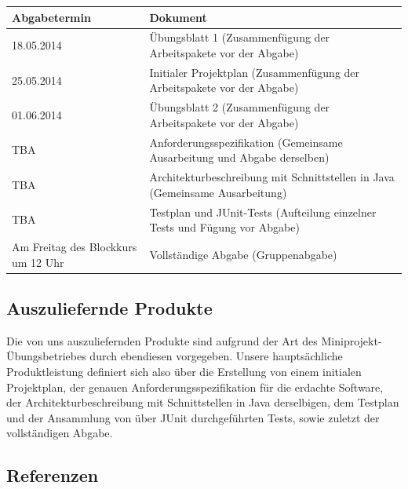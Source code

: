 \documentclass[fontsize=12pt,paper=a4,twoside]{scrartcl}
\begin{document}
\begin{tabular}{|p{7.5cm}|p{7.5cm}|}\hline
   \textbf{Abgabetermin} & \textbf{Dokument}\\ \hline \hline
   18.05.2014 & Übungsblatt 1 (Zusammenfügung der Arbeitspakete vor der Abgabe) \\ \hline
   25.05.2014 & Initialer Projektplan (Zusammenfügung der Arbeitspakete vor der Abgabe)\\ \hline
   01.06.2014 & Übungsblatt 2 (Zusammenfügung der Arbeitspakete vor der Abgabe)\\ \hline
   TBA & Anforderungsspezifikation (Gemeinsame Ausarbeitung und Abgabe derselben)\\ \hline
   TBA & Architekturbeschreibung mit Schnittstellen in Java (Gemeinsame Ausarbeitung)\\
   TBA & Testplan und JUnit-Tests (Aufteilung einzelner Tests und Fügung vor Abgabe)\\ \hline
  Am Freitag des Blockkurs um 12 Uhr & Vollständige Abgabe (Gruppenabgabe)\\ \hline
\end{tabular}


\subsection{Auszuliefernde Produkte}

Die von uns auszuliefernden Produkte sind aufgrund der Art des Miniprojekt-Übungsbetriebes durch ebendiesen vorgegeben.\newline
Unsere hauptsächliche Produktleistung definiert sich also über die Erstellung von einem initialen Projektplan, der genauen Anforderungsspezifikation für die erdachte Software, der Architekturbeschreibung mit Schnittstellen in Java derselbigen, dem Testplan und der Ansammlung von über JUnit durchgeführten Tests, sowie zuletzt der vollständigen Abgabe.

\subsection{Referenzen}
%
%
%
%

{\renewcommand\section[2]{}
	
}
\end{document}
